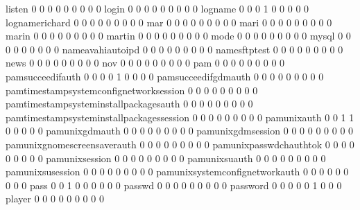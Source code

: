 \documentclass[compress,8pt]{beamer}
\begin{document}
\begin{frame}
\begin{Schunk}
  listen                                     0   0   0   0   0   0   0   0   0
  login                                      0   0   0   0   0   0   0   0   0
  logname                                    0   0   0   1   0   0   0   0   0
  lognamerichard                             0   0   0   0   0   0   0   0   0
  mar                                        0   0   0   0   0   0   0   0   0
  mari                                       0   0   0   0   0   0   0   0   0
  marin                                      0   0   0   0   0   0   0   0   0
  martin                                     0   0   0   0   0   0   0   0   0
  mode                                       0   0   0   0   0   0   0   0   0
  mysql                                      0   0   0   0   0   0   0   0   0
  nameavahiautoipd                           0   0   0   0   0   0   0   0   0
  namesftptest                               0   0   0   0   0   0   0   0   0
  news                                       0   0   0   0   0   0   0   0   0
  nov                                        0   0   0   0   0   0   0   0   0
  pam                                        0   0   0   0   0   0   0   0   0
  pamsucceedifauth                           0   0   0   0   1   0   0   0   0
  pamsucceedifgdmauth                        0   0   0   0   0   0   0   0   0
  pamtimestampsystemconfignetworksession     0   0   0   0   0   0   0   0   0
  pamtimestampsysteminstallpackagesauth      0   0   0   0   0   0   0   0   0
  pamtimestampsysteminstallpackagessession   0   0   0   0   0   0   0   0   0
  pamunixauth                                0   0   1   1   0   0   0   0   0
  pamunixgdmauth                             0   0   0   0   0   0   0   0   0
  pamunixgdmsession                          0   0   0   0   0   0   0   0   0
  pamunixgnomescreensaverauth                0   0   0   0   0   0   0   0   0
  pamunixpasswdchauthtok                     0   0   0   0   0   0   0   0   0
  pamunixsession                             0   0   0   0   0   0   0   0   0
  pamunixsuauth                              0   0   0   0   0   0   0   0   0
  pamunixsusession                           0   0   0   0   0   0   0   0   0
  pamunixsystemconfignetworkauth             0   0   0   0   0   0   0   0   0
  pass                                       0   0   1   0   0   0   0   0   0
  passwd                                     0   0   0   0   0   0   0   0   0
  password                                   0   0   0   0   0   1   0   0   0
  player                                     0   0   0   0   0   0   0   0   0

\end{Schunk}
\end{frame}
\end{document}
